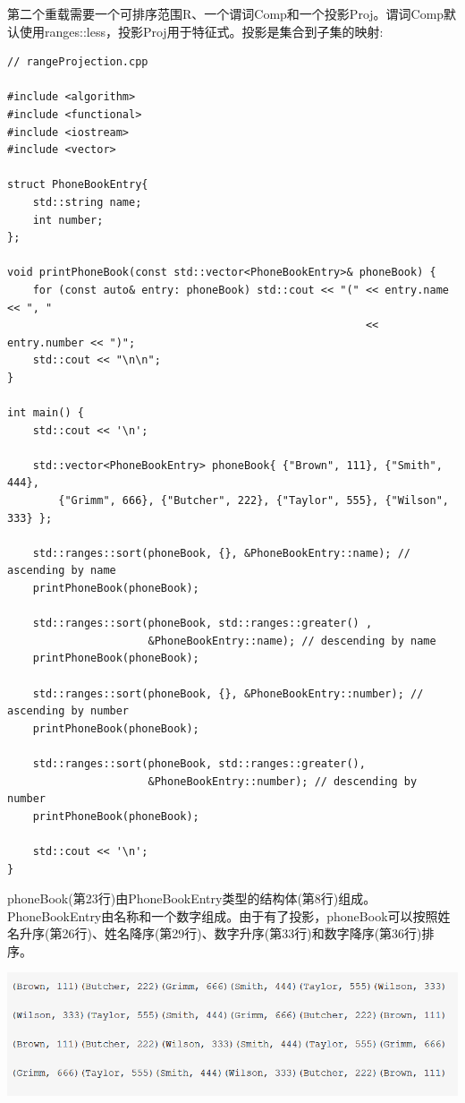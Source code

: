 第二个重载需要一个可排序范围R、一个谓词Comp和一个投影Proj。谓词Comp默认使用ranges::less，投影Proj用于特征式。投影是集合到子集的映射:

\begin{lstlisting}[style=styleCXX]
// rangeProjection.cpp

#include <algorithm>
#include <functional>
#include <iostream>
#include <vector>

struct PhoneBookEntry{
	std::string name;
	int number;
};

void printPhoneBook(const std::vector<PhoneBookEntry>& phoneBook) {
	for (const auto& entry: phoneBook) std::cout << "(" << entry.name << ", "
	                                                    << entry.number << ")";
	std::cout << "\n\n";
}

int main() {
	std::cout << '\n';
	
	std::vector<PhoneBookEntry> phoneBook{ {"Brown", 111}, {"Smith", 444},
		{"Grimm", 666}, {"Butcher", 222}, {"Taylor", 555}, {"Wilson", 333} };
	
	std::ranges::sort(phoneBook, {}, &PhoneBookEntry::name); // ascending by name
	printPhoneBook(phoneBook);
	
	std::ranges::sort(phoneBook, std::ranges::greater() ,
	                  &PhoneBookEntry::name); // descending by name
	printPhoneBook(phoneBook);
	
	std::ranges::sort(phoneBook, {}, &PhoneBookEntry::number); // ascending by number
	printPhoneBook(phoneBook);
	
	std::ranges::sort(phoneBook, std::ranges::greater(),
	                  &PhoneBookEntry::number); // descending by number
	printPhoneBook(phoneBook);
	
	std::cout << '\n';
}
\end{lstlisting}

phoneBook(第23行)由PhoneBookEntry类型的结构体(第8行)组成。PhoneBookEntry由名称和一个数字组成。由于有了投影，phoneBook可以按照姓名升序(第26行)、姓名降序(第29行)、数字升序(第33行)和数字降序(第36行)排序。

\begin{center}
\includegraphics[width=1.0\textwidth]{content/3/chapter5/images/1-1.png}\\
\end{center}

